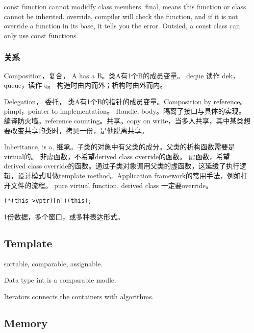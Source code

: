 \documentclass[UTF8]{../computerUniverse}
\begin{document}
const function cannot modidfy class members. 
final, means this function or class cannot be inherited.
override, compiler will check the function, and if it is not override a function in its base, it tells you the error.
Outsied, a const class can only use const functions.



\subsubsection{关系}
Composition，复合， A has a B。类A有1个B的成员变量。
deque 读作 dek， queue，读作 q。
构造时由内而外；析构时由外而内。

Delegation， 委托， 类A有1个B的指针的成员变量。Composition by reference。pimpl，pointer to implementation。 Handle, body。隔离了接口与具体的实现。编译防火墙。reference counting。共享。copy on write，当多人共享，其中某类想要改变共享的类时，拷贝一份，是他脱离共享。

Inheritance, is a, 继承。子类的对象中有父类的成分。父类的析构函数需要是virtual的。
非虚函数，不希望derived class override的函数。
虚函数，希望derived class override的函数。通过子类对象调用父类的虚函数，这延缓了执行逻辑，设计模式叫做template method。Application framework的常用手法，例如打开文件的流程。
pure virtual function, derived class 一定要override。
\begin{lstlisting}
(*(this->vptr)[n])(this);

\end{lstlisting}


1份数据，多个窗口，或多种表达形式。






\subsection{Template}
sortable, comparable, assignable.

Data type int is a comparable modle.

Iterators connects the containers with algorithms.






\subsection{Memory}
\end{document}
